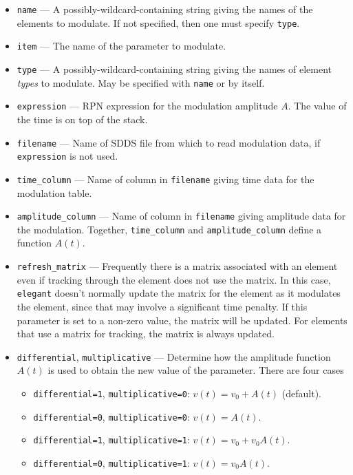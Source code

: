 \documentclass[11pt]{article}
\begin{document}
\begin{itemize}
\item \verb|name| --- A possibly-wildcard-containing string giving the names of the
        elements to modulate. If not specified, then one must specify \verb|type|.
\item \verb|item| --- The name of the parameter to modulate.
\item \verb|type| --- A possibly-wildcard-containing string giving the names of element
        {\em types} to modulate.  May be specified with \verb|name| or by itself.
\item \verb|expression| --- RPN expression for the modulation amplitude $A$.  The value
  of the time is on top of the stack. 
\item \verb|filename| --- Name of SDDS file from which to read modulation data, if
  \verb|expression| is not used.
\item \verb|time_column| --- Name of column in \verb|filename| giving time data for the
  modulation table.
\item \verb|amplitude_column| --- Name of column in \verb|filename| giving amplitude data
  for the modulation.  Together, \verb|time_column| and \verb|amplitude_column| define
  a function $A(t)$.
\item \verb|refresh_matrix| --- Frequently there is a matrix associated with an element even
  if tracking through the element does not use the matrix.  In this case, {\tt elegant} doesn't
  normally update the matrix for the element as it modulates the element, since that may involve
  a significant time penalty.  If this parameter is set to a non-zero value, the matrix will
  be updated.  For elements that use a matrix for tracking, the matrix is always updated.
\item \verb|differential|, \verb|multiplicative| --- Determine how the amplitude function
  $A(t)$ is used to obtain the new value of the parameter.  There are four cases
  \begin{itemize}
    \item \verb|differential=1|, \verb|multiplicative=0|: $v(t) = v_0 + A(t)$ (default).
    \item \verb|differential=0|, \verb|multiplicative=0|: $v(t) = A(t)$.  
    \item \verb|differential=1|, \verb|multiplicative=1|: $v(t) = v_0 + v_0 A(t)$.  
    \item \verb|differential=0|, \verb|multiplicative=1|: $v(t) = v_0 A(t)$.  
  \end{itemize}

\end{itemize}
\end{document}
